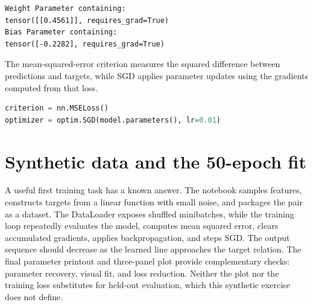 \documentclass[../labs.tex]{subfiles}
\begin{document}
\label{res:lab01_cell_018}

\begin{lstlisting}[style=terminalOutput]
Weight Parameter containing:
tensor([[0.4561]], requires_grad=True)
Bias Parameter containing:
tensor([-0.2282], requires_grad=True)
\end{lstlisting}


\noindent The mean-squared-error criterion measures the squared difference between predictions and targets, while SGD applies parameter updates using the gradients computed from that loss.\par
\begin{lstlisting}[language=Python,basicstyle=\ttfamily\scriptsize,breaklines=true,breakatwhitespace=false,columns=fullflexible,keepspaces=true,numbers=none]
criterion = nn.MSELoss()
optimizer = optim.SGD(model.parameters(), lr=0.01)
\end{lstlisting}

\label{res:lab01_cell_020}

\section{Synthetic data and the 50-epoch fit}

A useful first training task has a known answer. The notebook samples features, constructs targets from a linear function with small noise, and packages the pair as a dataset. The DataLoader exposes shuffled minibatches, while the training loop repeatedly evaluates the model, computes mean squared error, clears accumulated gradients, applies backpropagation, and steps SGD. The output sequence should decrease as the learned line approaches the target relation. The final parameter printout and three-panel plot provide complementary checks: parameter recovery, visual fit, and loss reduction. Neither the plot nor the training loss substitutes for held-out evaluation, which this synthetic exercise does not define.
\end{document}
